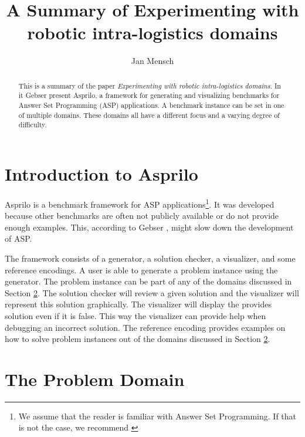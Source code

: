 \documentclass[runningheads]{llncs}
\newcommand{\papertitle}{Experimenting with robotic intra-logistics domains}
\newcommand{\authorquote}{Gebser \etal}
\begin{document}
\title{A Summary of \papertitle}

\author{Jan Mensch}




%
\maketitle              %
%
\begin{abstract}
This is a summary of the paper \textit{\papertitle}\cite{gebser2018experimenting}. In it \authorquote{}   present Asprilo, a framework for generating and visualizing benchmarks for Answer Set Programming (ASP) applications. A benchmark instance can be set in one of multiple domains. These domains all have a different focus and a varying degree of difficulty. 


\end{abstract}

\section{Introduction to Asprilo}

Asprilo is a benchmark framework for ASP applications\footnote{We assume that the reader is familiar with Answer Set Programming. If that is not the case, we recommend \cite{erdem2016applications}}. It was developed because other benchmarks are often not publicly available or do not provide enough examples. This, according to \authorquote{}, might slow down the development of ASP. 

The framework consists of a generator, a solution checker, a visualizer, and some reference encodings. A user is able to generate a problem instance using the generator. The problem instance can be part of any of the domains discussed in Section \ref{sec:problem}. The solution checker will review a given solution and the visualizer will represent this solution graphically. The visualizer will display the provides solution even if it is false. This way the visualizer can provide help when debugging an incorrect solution. The reference encoding provides examples on how to solve problem instances out of the domains discussed in Section \ref{sec:problem}.



\section{The Problem Domain} \label{sec:problem}
\end{document}
